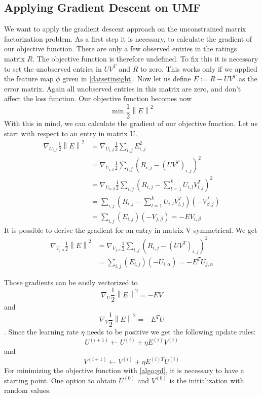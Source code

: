 \documentclass[DIV=14,twocolumn]{scrartcl}
\newcommand{\norm}[1]{\left\lVert#1\right\rVert}
\begin{document}
\subsection{Applying Gradient Descent on UMF} 
We want to apply the gradient descent approach on the unconstrained matrix factorization problem. 
As a first step it is necessary, to calculate the gradient of our objective function. There are only a few observed entries in the ratings matrix $R$. The objective function is therefore undefined. To fix this it is necessary to set the unobserved entries in $UV^T$ and $R$ to zero. This works only if we applied the feature map $\phi$ given in \autoref{datsetinsight}. 
Now let us define $E:=R-UV^T$ as the error matrix. Again all unobserved entries in this matrix are zero, and don't affect the loss function. Our objective function becomes now \[\min\frac{1}{2}\norm{E}^2\]
With this in mind, we can calculate the gradient of our objective function.
Let us start with respect to an entry in matrix U.
\begin{equation*}
\begin{split}
\nabla_{U_{i,\beta}} \frac{1}{2}\norm{E}^2 &= \nabla_{U_{i,\beta}} \frac{1}{2}\sum_{i,j}E_{i,j}^2 \\ &=\nabla_{U_{i,\beta}} \frac{1}{2}\sum_{i,j}(R_{i,j}-(UV^T)_{i,j})^2 \\
&=\nabla_{U_{\alpha,\beta}} \frac{1}{2}\sum_{i,j}(R_{i,j}-\sum_{l=1}^k U_{i,l}V^T_{l,j})^2\\
&=\sum_{i,j}(R_{i,j}-\sum_{l=1}^k U_{i,l}V^T_{l,j})(-V^T_{\beta,j})\\
&=\sum_{i,j}(E_{i,j})(-V_{j,\beta})=-EV_{i,\beta} 
\end{split}
\end{equation*}
It is possible to derive the gradient for an entry in matrix V symmetrical. We get 
\begin{equation*}
\begin{split}
\nabla_{V_{j,\alpha}} \frac{1}{2}\norm{E}^2 &= \nabla_{V_{j,\alpha}} \frac{1}{2}\sum_{i,j}(R_{i,j}-(UV^T)_{i,j})^2\\
&=\sum_{i,j}(E_{i,j})(-U_{i,\alpha})=-E^TU_{j,\alpha}
\end{split}
\end{equation*}

Those gradients can be easily vectorized to $$\nabla_U \frac{1}{2}\norm{E}^2=-EV$$ and  $$\nabla_V \frac{1}{2}\norm{E}^2=-E^TU$$. Since the learning rate $\eta$ needs to be positive we get the following update rules: \[U^{(i+1)} \leftarrow U^{(i)} + \eta E^{(i)}V^{(i)}\] and \[V^{(i+1)} \leftarrow V^{(i)} + \eta E^{(i)T}U^{(i)}\]
For minimizing the objective function with \autoref{algo:gd}, it is necessary to have a starting point. One option to obtain $U^{(0)}$ and $V^{(0)}$ is the initialization with random values. 
\end{document}
